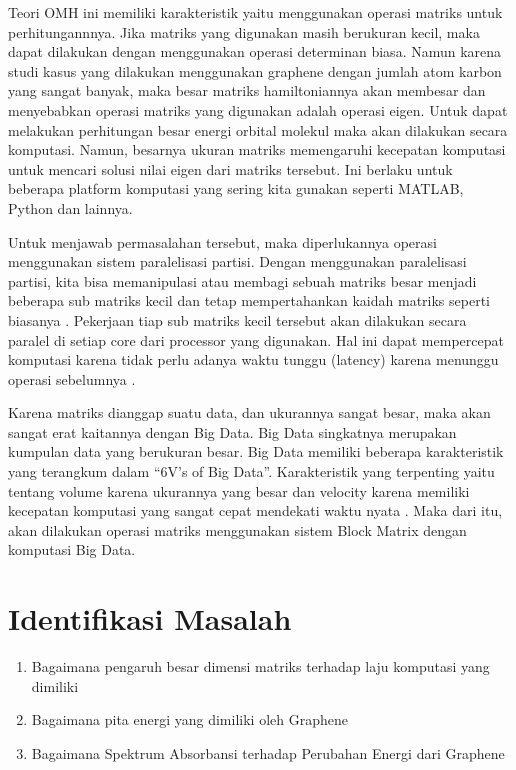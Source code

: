 \documentclass[12pt,a4paper]{report}
\begin{document}
	Teori OMH ini memiliki karakteristik yaitu menggunakan operasi matriks untuk perhitungannnya. Jika matriks yang digunakan masih berukuran kecil, maka dapat dilakukan dengan menggunakan operasi determinan biasa. Namun karena studi kasus yang dilakukan menggunakan graphene dengan jumlah atom karbon yang sangat banyak, maka besar matriks hamiltoniannya akan membesar dan menyebabkan operasi matriks yang digunakan adalah operasi eigen. Untuk dapat melakukan perhitungan besar energi orbital molekul maka akan dilakukan secara komputasi. Namun, besarnya ukuran matriks memengaruhi kecepatan komputasi untuk mencari solusi nilai eigen dari matriks tersebut. Ini berlaku untuk beberapa platform komputasi yang sering kita gunakan seperti MATLAB, Python dan lainnya.  
	
	Untuk menjawab permasalahan tersebut, maka diperlukannya operasi menggunakan sistem paralelisasi partisi. Dengan menggunakan paralelisasi partisi, kita bisa memanipulasi atau membagi sebuah matriks besar menjadi beberapa sub matriks kecil dan tetap mempertahankan kaidah matriks seperti biasanya \cite{Ni2015}. Pekerjaan tiap sub matriks kecil tersebut akan dilakukan secara paralel di setiap core dari processor yang digunakan. Hal ini dapat mempercepat komputasi karena tidak perlu adanya waktu tunggu (latency) karena menunggu operasi sebelumnya \cite{Clayden2012}.  
	
	Karena matriks dianggap suatu data, dan ukurannya sangat besar, maka akan sangat erat kaitannya dengan Big Data. Big Data singkatnya merupakan kumpulan data yang berukuran besar. Big Data memiliki beberapa karakteristik yang terangkum dalam “6V’s of Big Data”. Karakteristik yang terpenting yaitu tentang volume karena ukurannya yang besar dan velocity karena memiliki kecepatan komputasi yang sangat cepat mendekati waktu nyata \cite{Clemons2010}. Maka dari itu, akan dilakukan operasi matriks menggunakan sistem Block Matrix dengan komputasi Big Data.


	\section{Identifikasi Masalah}
	\begin{enumerate}
		\item Bagaimana pengaruh besar dimensi matriks terhadap laju komputasi yang dimiliki
	   	\item Bagaimana pita energi yang dimiliki oleh Graphene
	   	\item Bagaimana Spektrum Absorbansi terhadap Perubahan Energi dari Graphene
	\end{enumerate}
\end{document}
